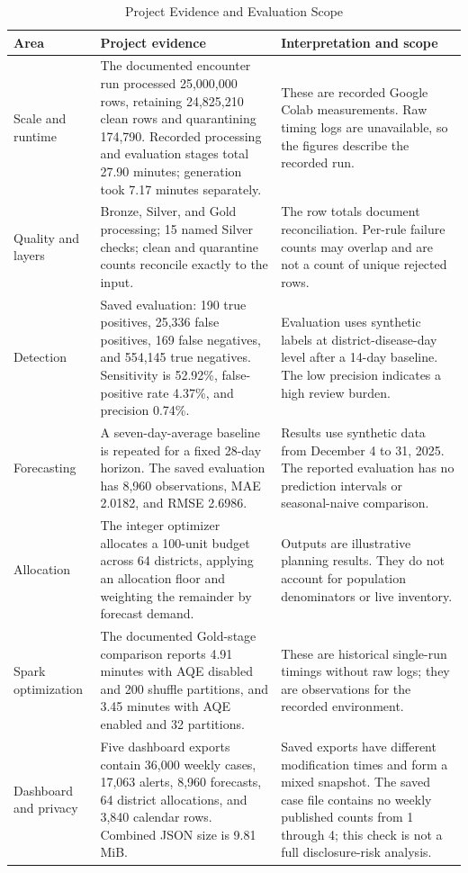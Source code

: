 \documentclass[conference]{IEEEtran}
\begin{document}
\begin{table}[htbp]
\caption{Project Evidence and Evaluation Scope}
\label{tab:evidence}
\centering\small
\begin{tabularx}{\textwidth}{p{3.0cm}X p{4.4cm}}
\toprule
Area & Project evidence & Interpretation and scope \\
\midrule
Scale and runtime & The documented encounter run processed 25,000,000 rows, retaining 24,825,210 clean rows and quarantining 174,790. Recorded processing and evaluation stages total 27.90 minutes; generation took 7.17 minutes separately. & These are recorded Google Colab measurements. Raw timing logs are unavailable, so the figures describe the recorded run. \\
Quality and layers & Bronze, Silver, and Gold processing; 15 named Silver checks; clean and quarantine counts reconcile exactly to the input. & The row totals document reconciliation. Per-rule failure counts may overlap and are not a count of unique rejected rows. \\
Detection & Saved evaluation: 190 true positives, 25,336 false positives, 169 false negatives, and 554,145 true negatives. Sensitivity is 52.92\%, false-positive rate 4.37\%, and precision 0.74\%. & Evaluation uses synthetic labels at district-disease-day level after a 14-day baseline. The low precision indicates a high review burden. \\
Forecasting & A seven-day-average baseline is repeated for a fixed 28-day horizon. The saved evaluation has 8,960 observations, MAE 2.0182, and RMSE 2.6986. & Results use synthetic data from December 4 to 31, 2025. The reported evaluation has no prediction intervals or seasonal-naive comparison. \\
Allocation & The integer optimizer allocates a 100-unit budget across 64 districts, applying an allocation floor and weighting the remainder by forecast demand. & Outputs are illustrative planning results. They do not account for population denominators or live inventory. \\
Spark optimization & The documented Gold-stage comparison reports 4.91 minutes with AQE disabled and 200 shuffle partitions, and 3.45 minutes with AQE enabled and 32 partitions. & These are historical single-run timings without raw logs; they are observations for the recorded environment. \\
Dashboard and privacy & Five dashboard exports contain 36,000 weekly cases, 17,063 alerts, 8,960 forecasts, 64 district allocations, and 3,840 calendar rows. Combined JSON size is 9.81 MiB. & Saved exports have different modification times and form a mixed snapshot. The saved case file contains no weekly published counts from 1 through 4; this check is not a full disclosure-risk analysis. \\
\bottomrule
\end{tabularx}
\end{table}
\end{document}
